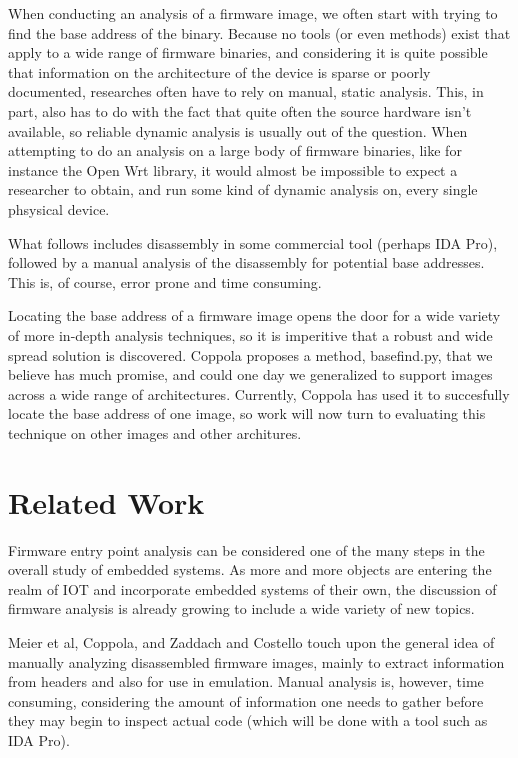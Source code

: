 \documentclass[letterpaper,twocolumn,10pt]{article}
\begin{document}
When conducting an analysis of a firmware image, we often start with trying to find the base address of the binary. Because no tools (or even methods) exist that apply to a wide range of firmware binaries, and considering it is quite possible that information on the architecture of the device is sparse or poorly documented, researches often have to rely on manual, static analysis. This, in part, also has to do with the fact that quite often the source hardware isn't available, so reliable dynamic analysis is usually out of the question. When attempting to do an analysis on a large body of firmware binaries, like for instance the Open Wrt library, it would almost be impossible to expect a researcher to obtain, and run some kind of dynamic analysis on, every single phsysical device.

What follows includes disassembly in some commercial tool (perhaps IDA Pro), followed by a manual analysis of the disassembly for potential base addresses. This is, of course, error prone and time consuming.

Locating the base address of a firmware image opens the door for a wide variety of more in-depth analysis techniques, so it is imperitive that a robust and wide spread solution is discovered. Coppola\cite{cloudscale2013} proposes a method, basefind.py, that we believe has much promise, and could one day we generalized to support images across a wide range of architectures. Currently, Coppola has used it to succesfully locate the base address of one image, so work will now turn to evaluating this technique on other images and other architures.

\section{Related Work}
Firmware entry point analysis can be considered one of the many steps in the overall study of embedded systems. As more and more objects are entering the realm of IOT and incorporate embedded systems of their own, the discussion of firmware analysis is already growing to include a wide variety of new topics. 

Meier et al\cite{fitnesstrackers2016}, Coppola\cite{cloudscale2013}, and Zaddach and Costello\cite{securityfirmwarereverse2013} touch upon the general idea of manually analyzing disassembled firmware images, mainly to extract information from headers and also for use in emulation. Manual analysis is, however, time consuming, considering the amount of information one needs to gather before they may begin to inspect actual code (which will be done with a tool such as IDA Pro). 
\end{document}

